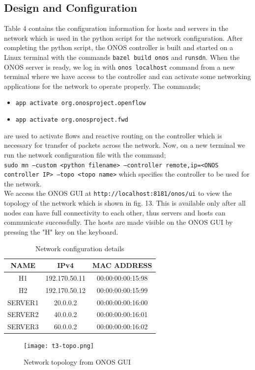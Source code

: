 \documentclass{article}
\begin{document}
\subsection{Design and Configuration}
Table 4 contains the configuration information for hosts and servers in the network which is used in the python script for the network configuration. After completing the python script, the ONOS controller is built and started on a Linux terminal with the commands \texttt{bazel build onos} and \texttt{runsdn}. When the ONOS server is ready, we log in with \texttt{onos localhost} command from a new terminal where we have access to the controller and can activate some networking applications for the network to operate properly. The commands;
	\begin{itemize}
		\centering
		\item \texttt{app activate org.onosproject.openflow}
		\item \texttt{app activate org.onosproject.fwd}
	\end{itemize}
are used to activate flows and reactive routing on the controller which is necessary for transfer of packets across the network. Now, on a new terminal we run the network configuration file with the command; \\ \texttt{sudo mn --custom <python filename> --controller remote,ip=<ONOS controller IP> --topo <topo name>} which specifies the controller to be used for the network. \\ We access the ONOS GUI at \texttt{http://localhost:8181/onos/ui} to view the topology of the network which is shown in fig. 13. This is available only after all nodes can have full connectivity to each other, thus servers and hosts can communicate successfully. The hosts are made visible on the ONOS GUI by pressing the "H" key on the keyboard.
    	\begin{table}[h]
        		\centering
        		\begin{tabular}{|c|c|c|}
            		\hline
            		NAME & IPv4 & MAC ADDRESS \\
            		\hline
            		H1 & 192.170.50.11 & 00:00:00:00:15:98 \\
           		H2 & 192.170.50.12 & 00:00:00:00:15:99 \\
            		SERVER1 & 20.0.0.2 & 00:00:00:00:16:00 \\
            		SERVER2 & 40.0.0.2 & 00:00:00:00:16:01 \\
            		SERVER3 & 60.0.0.2 & 00:00:00:00:16:02 \\
            		\hline
        		\end{tabular}
        		\caption{Network configuration details}
        		\label{tab:4}
    	\end{table}
    	\begin{figure}[h]
        		\centering
        		\texttt{[image: t3-topo.png]}
        		\caption{Network topology from ONOS GUI}
        		\label{fig:t3-1}
    	\end{figure}
\end{document}
